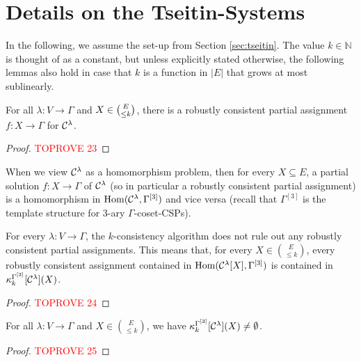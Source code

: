 \documentclass[a4paper,english, thm-restate]{lipics-v2021}
\newcommand{\kcol}[3]{\kappa_{#1}^{#2}[#3]}
\newcommand{\Hom}[2]{\mathrm{Hom}(#1,#2)}
\newcommand{\bbN}{\mathbb{N}}
\newcommand{\CosetGrpTmplt}[2]{#1^{[#2]}}
\begin{document}
	
	\section{Details on the Tseitin-Systems}
	\label{app:tseitin}
	
	In the following, we assume the set-up from Section \ref{sec:tseitin}. The value $k \in \bbN$ is thought of as a constant, but
	unless explicitly stated otherwise, the following lemmas also hold in case that $k$ is a function in $|E|$ that grows at most sublinearly. 
	\begin{lemma}
		\label{lem:robustly-consistent-for-all-small-contexts}
		For all $\lambda \colon V\to \Gamma$ and $X \in \tbinom{E}{\leq k}$,
		there is a robustly consistent partial assignment $f \colon X \to \Gamma$ for $\grpCSPf{H}{\Gamma}{\lambda}$. 
	\end{lemma}
	\begin{proof}\textcolor{red}{TOPROVE 23}\end{proof}	
	


	\noindent When we view $\grpCSPf{H}{\Gamma}{\lambda}$ as a homomorphism problem,
	then for every $X \subseteq E$,
	a partial solution $f \colon X \to \Gamma$ of $\grpCSPf{H}{\Gamma}{\lambda}$ (so in particular a robustly consistent partial assignment)
	is a homomorphism in $\Hom{\grpCSPf{H}{\Gamma}{\lambda}}{\CosetGrpTmplt{\Gamma}{3}}$
	and vice versa
	(recall that $\CosetGrpTmplt{\Gamma}{3}$ is the template structure for $3$-ary $\Gamma$-coset-CSPs).
	
	\begin{lemma}
		\label{lem:robustlyConsistentSurviveKconsistency}
		For every $\lambda \colon V \to \Gamma$,
		the $k$-consistency algorithm does not rule out any robustly consistent partial assignments.
		This means that, for every $X \in \binom{E}{\leq k}$,  every robustly consistent assignment
		contained in $\Hom{\grpCSPf{H}{\Gamma}{\lambda}[X]}{\CosetGrpTmplt{\Gamma}{3}}$
		is contained in $\kcol{k}{\CosetGrpTmplt{\Gamma}{3}}{\grpCSPf{H}{\Gamma}{\lambda}} (X)$.
	\end{lemma}
	\begin{proof}\textcolor{red}{TOPROVE 24}\end{proof}
	
	
	\begin{corollary}
		\label{cor:kConsistencyFails}
		For all $\lambda \colon V \to \Gamma$ and $X \in \binom{E}{\leq k}$,
		we have $\kcol{k}{\CosetGrpTmplt{\Gamma}{3}}{\grpCSPf{H}{\Gamma}{\lambda}}(X) \neq \emptyset$.
	\end{corollary}	
	\begin{proof}\textcolor{red}{TOPROVE 25}\end{proof}	
	
\end{document}
